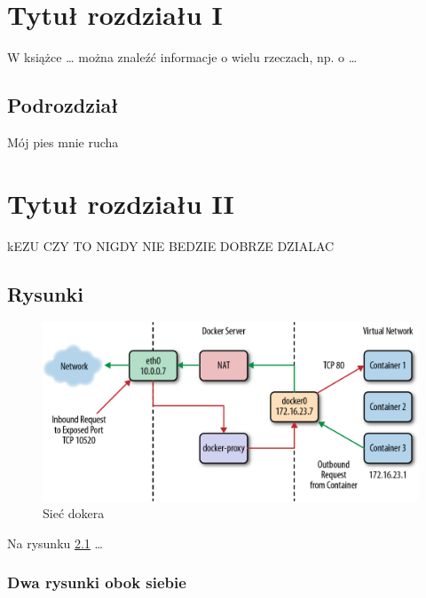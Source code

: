 
\chapter{Tytuł rozdziału I}

W książce \cite{docker_compose_reference} \dots
można znaleźć informacje o wielu rzeczach, np. o \dots

\section{Podrozdział}
Mój pies mnie rucha

\chapter{Tytuł rozdziału II}
kEZU CZY TO NIGDY NIE BEDZIE DOBRZE DZIALAC


\section{Rysunki}

\begin{figure}
\centering\includegraphics[width=.6\textwidth]{img/swarm-network}
\caption{Sieć dokera }  \label{rys:network}
\end{figure}

Na rysunku \ref{rys:network} \dots


\subsection{Dwa rysunki obok siebie}

